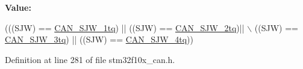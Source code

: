 {\bfseries Value\+:}
\begin{DoxyCode}
(((SJW) == \hyperlink{group___c_a_n__synchronisation__jump__width_ga4e03d22ae683b63cb4df238449ec967c}{CAN\_SJW\_1tq}) || ((SJW) == \hyperlink{group___c_a_n__synchronisation__jump__width_gad39e7656c555cc00bc4d7c1bff39916f}{CAN\_SJW\_2tq})|| \(\backslash\)
                         ((SJW) == \hyperlink{group___c_a_n__synchronisation__jump__width_gab4de740e2184aac71c2c8cba22a8ecd2}{CAN\_SJW\_3tq}) || ((SJW) == 
      \hyperlink{group___c_a_n__synchronisation__jump__width_ga7f26a36d478c7ba1a1441b369d62f693}{CAN\_SJW\_4tq}))
\end{DoxyCode}


Definition at line 281 of file stm32f10x\+\_\+can.\+h.


